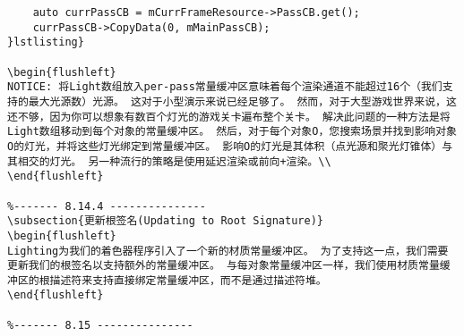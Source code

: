 \begin{lstlisting}
    auto currPassCB = mCurrFrameResource->PassCB.get();
    currPassCB->CopyData(0, mMainPassCB);
}lstlisting}

\begin{flushleft}
NOTICE: 将Light数组放入per-pass常量缓冲区意味着每个渲染通道不能超过16个（我们支持的最大光源数）光源。 这对于小型演示来说已经足够了。 然而，对于大型游戏世界来说，这还不够，因为你可以想象有数百个灯光的游戏关卡遍布整个关卡。 解决此问题的一种方法是将Light数组移动到每个对象的常量缓冲区。 然后，对于每个对象O，您搜索场景并找到影响对象O的灯光，并将这些灯光绑定到常量缓冲区。 影响O的灯光是其体积（点光源和聚光灯锥体）与其相交的灯光。 另一种流行的策略是使用延迟渲染或前向+渲染。\\
\end{flushleft}

%------- 8.14.4 ---------------
\subsection{更新根签名(Updating to Root Signature)}
\begin{flushleft}
Lighting为我们的着色器程序引入了一个新的材质常量缓冲区。 为了支持这一点，我们需要更新我们的根签名以支持额外的常量缓冲区。 与每对象常量缓冲区一样，我们使用材质常量缓冲区的根描述符来支持直接绑定常量缓冲区，而不是通过描述符堆。
\end{flushleft}

%------- 8.15 ---------------

\end{lstlisting}
